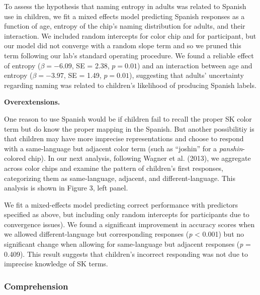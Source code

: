 \documentclass[
  english,
  ,man,floatsintext]{apa6}
\begin{document}
To assess the hypothesis that naming entropy in adults was related to Spanish use in children, we fit a mixed effects model predicting Spanish responses as a function of age, entropy of the chip's naming distribution for adults, and their interaction. We included random intercepts for color chip and for participant, but our model did not converge with a random slope term and so we pruned this term following our lab's standard operating procedure. We found a reliable effect of entropy (\(\beta = -6.09\), SE = 2.38, \(p = 0.01\)) and an interaction between age and entropy (\(\beta = -3.97\), SE = 1.49, \(p = 0.01\)), suggesting that adults' uncertainty regarding naming was related to children's likelihood of producing Spanish labels.

\textbf{Overextensions.}

One reason to use Spanish would be if children fail to recall the proper SK color term but do know the proper mapping in the Spanish. But another possibilitiy is that children may have more imprecise representations and choose to respond with a same-language but adjacent color term (such as \enquote{joshin} for a \emph{panshin}-colored chip). In our next analysis, following Wagner et al. (2013), we aggregate across color chips and examine the pattern of children's first responses, categorizing them as same-language, adjacent, and different-language. This analysis is shown in Figure 3, left panel.

We fit a mixed-effects model predicting correct performance with predictors specified as above, but including only random intercepts for participants due to convergence issues). We found a significant improvement in accuracy scores when we allowed different-language but corresponding responses (\emph{p} \textless{} 0.001) but no significant change when allowing for same-language but adjacent responses (\emph{p} = 0.409). This result suggests that children's incorrect responding was not due to imprecise knowledge of SK terms.

\hypertarget{comprehension}{%
\subsubsection{Comprehension}\label{comprehension}}
\end{document}

